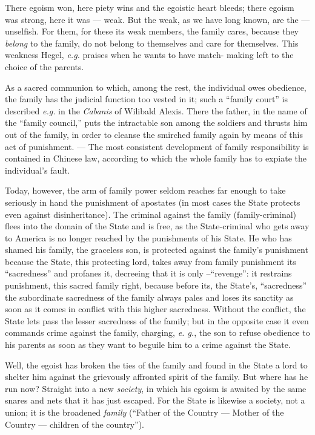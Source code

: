 There egoism won, here piety wins and the egoistic heart bleeds; there egoism 
was strong, here it was --- weak. But the weak, as we have long known, are the --- unselfish. For them, for these its weak members, the family cares, because 
they \textit{belong} to the family, do not belong to themselves and care for 
themselves. This weakness Hegel, \textit{e.g.} praises when he wants to have 
match- making left to the choice of the parents.

As a sacred communion to which, among the rest, the individual owes obedience, 
the family has the judicial function too vested in it; such a ``family 
court'' is described \textit{e.g.} in the \textit{Cabanis} \textit{}of 
Wilibald Alexis. There the father, in the name of the ``family council,'' 
puts the intractable son among the soldiers and thrusts him out of the family, 
in order to cleanse the smirched family again by means of this act of 
punishment. --- The most consistent development of family responsibility is 
contained in Chinese law, according to which the whole family has to expiate 
the individual's fault.

Today, however, the arm of family power seldom reaches far enough to take 
seriously in hand the punishment of apostates (in most cases the State 
protects even against disinheritance). The criminal against the family 
(family-criminal) flees into the domain of the State and is free, as the 
State-criminal who gets away to America is no longer reached by the 
punishments of his State. He who has shamed his family, the graceless son, is 
protected against the family's punishment because the State, this protecting 
lord, takes away from family punishment its ``sacredness'' and profanes it, 
decreeing that it is only --``revenge'': it restrains punishment, this 
sacred family right, because before its, the State's, ``sacredness'' the 
subordinate sacredness of the family always pales and loses its sanctity as 
soon as it comes in conflict with this higher sacredness. Without the 
conflict, the State lets pass the lesser sacredness of the family; but in the 
opposite case it even commands crime against the family, charging, \textit{e. 
g.}, the son to refuse obedience to his parents as soon as they want to 
beguile him to a crime against the State.

Well, the egoist has broken the ties of the family and found in the State a 
lord to shelter him against the grievously affronted spirit of the family. But 
where has he run now? Straight into a new \textit{society}, in which his 
egoism is awaited by the same snares and nets that it has just escaped. For 
the State is likewise a society, not a union; it is the broadened 
\textit{family} (``Father of the Country --- Mother of the Country --- children 
of the country'').

